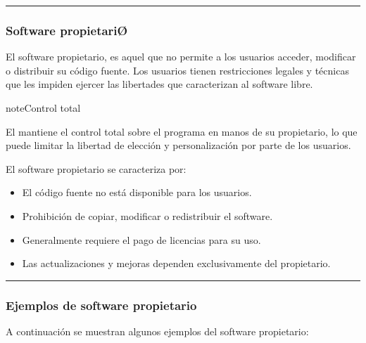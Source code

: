 \documentclass[letterpaper,10pt,spanish]{sphinxmanual}
\begin{document}
\bigskip\hrule\bigskip



\subsubsection{Software propietariØ}
\label{\detokenize{1_guias/10ofimatica/G1012:software-propietario}}
\sphinxAtStartPar
\sphinxfootnotemark[2] El software propietario, es aquel que no permite a los usuarios acceder, modificar o distribuir su código fuente. Los usuarios tienen restricciones legales y técnicas que les impiden ejercer las libertades que caracterizan al software libre.

\begin{sphinxadmonition}{note}{Control total}

\sphinxAtStartPar
El  mantiene el control total sobre el programa en manos de su propietario, lo que puede limitar la libertad de elección y personalización por parte de los usuarios.
\end{sphinxadmonition}

\sphinxAtStartPar
El software propietario se caracteriza por:
\begin{itemize}
\item {} 
\sphinxAtStartPar
El código fuente no está disponible para los usuarios.

\item {} 
\sphinxAtStartPar
Prohibición de copiar, modificar o redistribuir el software.

\item {} 
\sphinxAtStartPar
Generalmente requiere el pago de licencias para su uso.

\item {} 
\sphinxAtStartPar
Las actualizaciones y mejoras dependen exclusivamente del propietario.

\end{itemize}


\bigskip\hrule\bigskip



\subsubsection{Ejemplos de software propietario}
\label{\detokenize{1_guias/10ofimatica/G1012:ejemplos-de-software-propietario}}
\sphinxAtStartPar
A continuación se muestran algunos ejemplos del software propietario:
\end{document}
